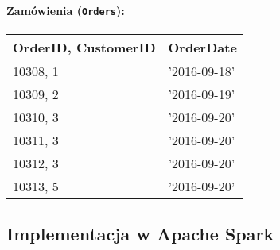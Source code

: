 \documentclass{article}
\begin{document}
\paragraph{Zamówienia (\texttt{Orders}):} 
\paragraph{} 

\begin{table}[H]
\begin{tabular}{l l}
\textbf{OrderID, CustomerID} & \textbf{OrderDate} \\
\hline
10308, 1 & '2016-09-18' \\
10309, 2 & '2016-09-19' \\
10310, 3 & '2016-09-20' \\
10311, 3 & '2016-09-20' \\
10312, 3 & '2016-09-20' \\
10313, 5 & '2016-09-20' \\
\end{tabular}
\end{table}

\newpage

\subsection{Implementacja w Apache Spark}
\end{document}
